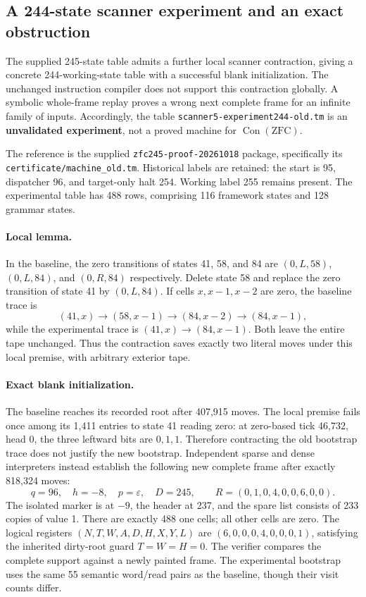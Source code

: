 \subsection{A 244-state scanner experiment and an exact obstruction}

The supplied 245-state table admits a further local scanner contraction,
giving a concrete 244-working-state table with a successful blank
initialization.  The unchanged instruction compiler does not support this
contraction globally.  A symbolic whole-frame replay proves a wrong next
complete frame for an infinite family of inputs.  Accordingly, the table
\texttt{scanner5-experiment244-old.tm} is an
\textbf{unvalidated experiment}, not a proved machine for
$\operatorname{Con}(\mathrm{ZFC})$.

The reference is the supplied \texttt{zfc245-proof-20261018} package,
specifically its \texttt{certificate/machine\_old.tm}.  Historical labels
are retained: the start is 95, dispatcher 96, and target-only halt 254.
Working label 255 remains present.  The experimental table has 488 rows,
comprising 116 framework states and 128 grammar states.

\paragraph{Local lemma.}
In the baseline, the zero transitions of states 41, 58, and 84 are
$(0,L,58)$, $(0,L,84)$, and $(0,R,84)$ respectively.  Delete state 58 and
replace the zero transition of state 41 by $(0,L,84)$.  If cells
$x,x-1,x-2$ are zero, the baseline trace is
\[
 (41,x)\longrightarrow(58,x-1)\longrightarrow(84,x-2)
 \longrightarrow(84,x-1),
\]
while the experimental trace is $(41,x)\longrightarrow(84,x-1)$.
Both leave the entire tape unchanged.  Thus the contraction saves exactly
two literal moves under this local premise, with arbitrary exterior tape.

\paragraph{Exact blank initialization.}
The baseline reaches its recorded root after 407,915 moves.  The local
premise fails once among its 1,411 entries to state 41 reading zero: at
zero-based tick 46,732, head 0, the three leftward bits are $0,1,1$.
Therefore contracting the old bootstrap trace does not justify the new
bootstrap.  Independent sparse and dense interpreters instead establish
the following new complete frame after exactly 818,324 moves:
\[
q=96,\quad h=-8,\quad p=\varepsilon,\quad D=245,
\qquad R=(0,1,0,4,0,0,6,0,0).
\]
The isolated marker is at $-9$, the header at 237, and the spare list
consists of 233 copies of value 1.  There are exactly 488 one cells;
all other cells are zero.  The logical registers
$(N,T,W,A,D,H,X,Y,L)$ are $(6,0,0,0,4,0,0,0,1)$, satisfying the inherited
dirty-root guard $T=W=H=0$.  The verifier compares the complete support
against a newly painted frame.  The experimental bootstrap uses the same
55 semantic word/read pairs as the baseline, though their visit counts
differ.

